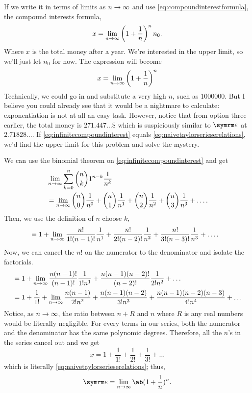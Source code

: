 If we write it in terms of limits as $n \rightarrow \infty$ and use \cref{eq:compoundinterestformula}, the compound interests formula,
\begin{equation*}
    x = \lim_{n \rightarrow \infty}\left(1 + \frac{1}{n}\right)^nn_0.
\end{equation*}
Where $x$ is the total money after a year. We're interested in the upper limit, so we'll just let $n_0$ for now. The expression will become
\begin{equation}
    x = \lim_{n \rightarrow \infty}\left(1 + \frac{1}{n}\right)^n \label{eq:infinitecompoundinterest}
\end{equation}
Technically, we could go in and substitute a very high $n$, such as $1000000$. But I believe you could already see that it would be a nightmare to calculate: exponentiation is not at all an easy task. However, notice that from option three earlier, the total money is $271.447\dots\$$ which is suspiciously similar to $\e$ at $2.71828\dots$. If \cref{eq:infinitecompoundinterest} equals \cref{eq:naivetaylorserieserelations}, we'd find the upper limit for this problem and solve the mystery.

We can use the binomial theorem on \cref{eq:infinitecompoundinterest} and get
\begin{align*}
    &\lim_{n \rightarrow \infty}\sum_{k = 0}^{n}{n \choose k}1^{n - k}\frac{1}{n^k} \\
    &= \lim_{n \rightarrow \infty}{n \choose 0}\frac{1}{n^0} + {n \choose 1}\frac{1}{n^1} + {n \choose 2}\frac{1}{n^2} + {n \choose 3}\frac{1}{n^3} + \dots.
\end{align*}
Then, we use the definition of $n$ choose $k$,
\begin{align*}
    &= 1 + \lim_{n \rightarrow \infty}\frac{n!}{1!(n - 1)!}\frac{1}{n^1} + \frac{n!}{2!(n - 2)!}\frac{1}{n^2} + \frac{n!}{3!(n - 3)!}\frac{1}{n^3} + \dots.
\end{align*}
Now, we can cancel the $n!$ on the numerator to the denominator and isolate the factorials.
\begin{align*}
    &= 1 + \lim_{n \rightarrow \infty}\frac{n(n - 1)!}{(n - 1)!}\frac{1}{1!n^1} + \frac{n(n - 1)(n - 2)!}{(n - 2)!}\frac{1}{2!n^2} + \dots \\
    &= 1 + \frac{1}{1!} + \lim_{n \rightarrow \infty} \frac{n(n - 1)}{2!n^2} + \frac{n(n - 1)(n - 2)}{3!n^3} + \frac{n(n - 1)(n - 2)(n - 3)}{4!n^4} + \dots
\end{align*}
Notice, as $n \rightarrow \infty$, the ratio between $n + R$ and $n$ where $R$ is any real numbers would be literally negligible. For every terms in our series, both the numerator and the denominator has the same polynomic degrees. Therefore, all the $n$'s in the series cancel out and we get
\begin{equation}
    x = 1 + \frac{1}{1!} + \frac{1}{2!} + \frac{1}{3!} + \dots
\end{equation}
which is literally \cref{eq:naivetaylorserieserelations}; thus,
\begin{equation}
	\e = \lim_{n \appr \infty}\ab(1 + \frac{1}{n})^n. \label{eq:e-def-infinite-interests}
\end{equation}

